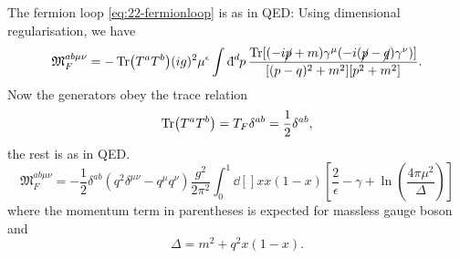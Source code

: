 The fermion loop \eqref{eq:22-fermionloop} is as in QED: Using dimensional regularisation, we have
\begin{equation}
  \mathfrak{M}_F^{ab \mu \nu} = - \Tr(T^{a} T^{b}) (ig)^2 \mu^{\epsilon} \int \bdd[d]{p} \frac{\Tr[(-i \cancel{p} + m) \gamma^{\mu} (-i (\cancel{p} - \cancel{q}) \gamma^\nu)]}{[(p - q)^2 + m^2][p^2 + m^2]}.
\end{equation}
Now the generators obey the trace relation
\begin{equation}
  \Tr(T^{a} T^{b}) = T_F \delta^{ab} = \frac{1}{2} \delta^{ab},
\end{equation}
the rest is as in QED.
\begin{equation}
  \mathfrak{M}_{F}^{ab \mu \nu} = -\frac{1}{2} \delta^{ab} \left( q^2 \delta^{\mu\nu} - q^{\mu} q^{\nu} \right) \frac{g^2}{2 \pi^2} \int_0^1 \dd[]{x} x(1 - x) \left[ \frac{2}{\epsilon} - \gamma + \ln( \frac{4 \pi \mu^2}{\Delta}) \right]
\end{equation}
where the momentum term in parentheses is expected for massless gauge boson and
\begin{equation}
  \Delta = m^2 + q^2 x(1 - x).
\end{equation}
